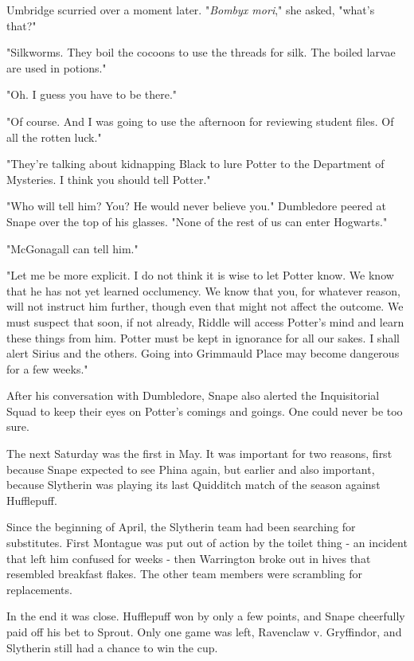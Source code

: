 Umbridge scurried over a moment later. "\emph{Bombyx mori}," she asked, "what's that?"

"Silkworms. They boil the cocoons to use the threads for silk. The boiled larvae are used in potions."

"Oh. I guess you have to be there."

"Of course. And I was going to use the afternoon for reviewing student files. Of all the rotten luck."

\sbreak

"They're talking about kidnapping Black to lure Potter to the Department of Mysteries. I think you should tell Potter."

"Who will tell him? You? He would never believe you." Dumbledore peered at Snape over the top of his glasses. "None of the rest of us can enter Hogwarts."

"McGonagall can tell him."

"Let me be more explicit. I do not think it is wise to let Potter know. We know that he has not yet learned occlumency. We know that you, for whatever reason, will not instruct him further, though even that might not affect the outcome. We must suspect that soon, if not already, Riddle will access Potter's mind and learn these things from him. Potter must be kept in ignorance for all our sakes. I shall alert Sirius and the others. Going into Grimmauld Place may become dangerous for a few weeks."

After his conversation with Dumbledore, Snape also alerted the Inquisitorial Squad to keep their eyes on Potter's comings and goings. One could never be too sure.

The next Saturday was the first in May. It was important for two reasons, first because Snape expected to see Phina again, but earlier and also important, because Slytherin was playing its last Quidditch match of the season against Hufflepuff.

Since the beginning of April, the Slytherin team had been searching for substitutes. First Montague was put out of action by the toilet thing - an incident that left him confused for weeks - then Warrington broke out in hives that resembled breakfast flakes. The other team members were scrambling for replacements.

In the end it was close. Hufflepuff won by only a few points, and Snape cheerfully paid off his bet to Sprout. Only one game was left, Ravenclaw v. Gryffindor, and Slytherin still had a chance to win the cup.

